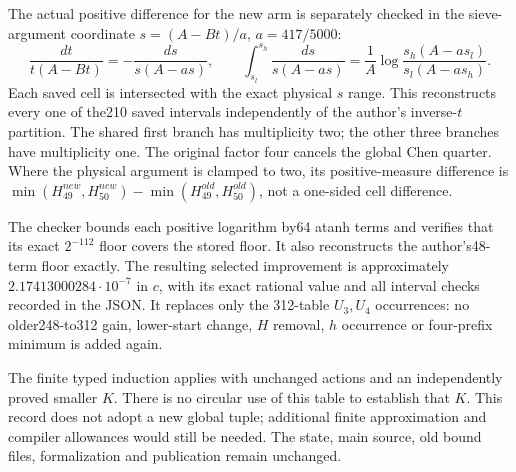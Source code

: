 The actual positive difference for the new arm is separately checked in
the sieve-argument coordinate $s=(A-Bt)/a$, $a=417/5000$:
\[
 \frac{dt}{t(A-Bt)}=-\frac{ds}{s(A-as)},\qquad
 \int_{s_l}^{s_h}\frac{ds}{s(A-as)}
 =\frac1A\log\frac{s_h(A-as_l)}{s_l(A-as_h)}.
\]
Each saved cell is intersected with the exact physical $s$ range. This
reconstructs every one of the210 saved intervals independently of the
author's inverse-$t$ partition. The shared first branch has multiplicity
two; the other three branches have multiplicity one. The original factor
four cancels the global Chen quarter. Where the physical argument is
clamped to two, its positive-measure difference is
$\min(H^{new}_{49},H^{new}_{50})-\min(H^{old}_{49},H^{old}_{50})$,
not a one-sided cell difference.

The checker bounds each positive logarithm by64 atanh terms and verifies
that its exact $2^{-112}$ floor covers the stored floor. It also reconstructs
the author's48-term floor exactly. The resulting selected improvement is
approximately $2.17413000284\cdot10^{-7}$ in $c$, with its exact rational
value and all interval checks recorded in the JSON. It replaces only the
312-table $U_3,U_4$ occurrences: no older248-to312 gain, lower-start change,
$H$ removal, $h$ occurrence or four-prefix minimum is added again.

The finite typed induction applies with unchanged actions and an independently
proved smaller $K$. There is no circular use of this table to establish that
$K$. This record does not adopt a new global tuple; additional finite
approximation and compiler allowances would still be needed. The state,
main source, old bound files, formalization and publication remain unchanged.
